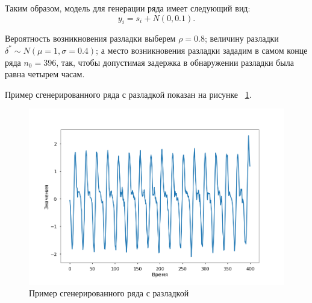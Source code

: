 \documentclass[%
12pt,
master,  %
natbib,      %
subf,        %
substylefile = spbu.rtx,
href,        %
colorlinks,  %
]{disser}
\begin{document}
Таким образом, модель для генерации ряда имеет следующий вид:
\begin{equation*} y_i = s_i + N(0,0.1).\end{equation*}

Вероятность возникновения разладки выберем $\rho = 0.8$; величину разладки $\delta^* \sim N(\mu = 1,\sigma = 0.4)$; а место возникновения разладки зададим в самом конце ряда $n_0 = 396$, так, чтобы допустимая задержка в обнаружении разладки была равна четырем часам.

Пример сгенерированного ряда с разладкой показан на рисунке ~\ref{fig:data_modeling_example_2}.

\begin{figure}[!hhh]
	\begin{center}
		\includegraphics[width=12cm]{data_modeling_example_2}
	\end{center}
	\vspace{-5mm}\caption{Пример сгенерированного ряда с разладкой}
	\label{fig:data_modeling_example_2}
\end{figure}

%
%
\end{document}
